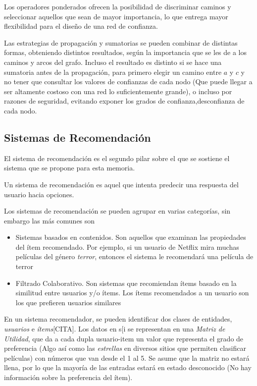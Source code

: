 Los operadores ponderados ofrecen la posibilidad de discriminar caminos y seleccionar aquellos que sean de mayor importancia, lo que entrega mayor flexibilidad para el diseño de una red de confianza. 

Las estrategias de propagación y sumatorias se pueden combinar de distintas formas, obteniendo distintos resultados, según la importancia que se les de a los caminos y arcos del grafo. Incluso el resultado es distinto si se hace una sumatoria antes de la propagación, para primero elegir un camino entre $a$ y $c$ y no tener que consultar los valores de confianzas de cada nodo (Que puede llegar a ser altamente costoso con una red lo suficientemente grande), o incluso por razones de seguridad, evitando exponer los grados de confianza,desconfianza de cada nodo. 

\subsection{Sistemas de Recomendación}

El sistema de recomendación es el segundo pilar sobre el que se sostiene el sistema que se propone para esta memoria.

Un sistema de recomendación es aquel que intenta predecir una respuesta del usuario hacia opciones.

Los sistemas de recomendación se pueden agrupar en varias categorías, sin embargo las más comunes son \cite{Resnick1997,Girgin}

\begin{itemize}
\item{Sistemas basados en contenidos. Son aquellos que examinan las propiedades del ítem recomendado. Por ejemplo, si un usuario de Netflix mira muchas películas del género \textit{terror}, entonces el sistema le recomendará una película de terror}

\item{Filtrado Colaborativo. Son sistemas que recomiendan ítems basado en la similitud entre usuarios y/o ítems. Los ítems recomendados a un usuario son los que prefieren usuarios similares}
\end{itemize}

En un sistema recomendador, se pueden identificar dos clases de entidades, \textit{usuarios} e \textit{ítems}[CITA]. Los datos en s[i se representan en una \textit{Matriz de Utilidad}, que da a cada dupla usuario-item un valor que representa el grado de preferencia (Algo así como las \textit{estrellas} en diversos sitios que permiten clasificar películas) con números que van desde el 1 al 5. Se asume que la matriz no estará llena, por lo que la mayoría de las entradas estará en estado desconocido (No hay información sobre la preferencia del ítem).

